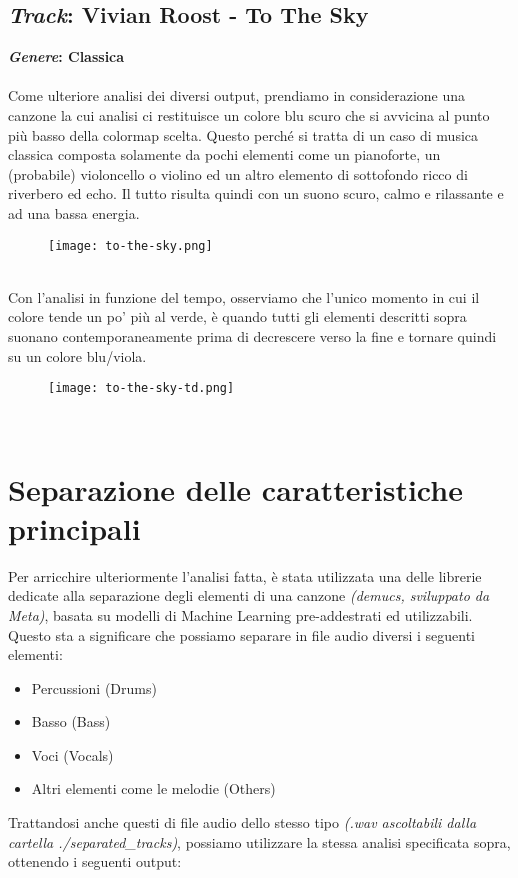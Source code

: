 \documentclass{article}
\begin{document}
\subsection{
    \textit{Track}: Vivian Roost - To The Sky
}
\textbf{\textit{Genere}: Classica}\\
\\
Come ulteriore analisi dei diversi output, prendiamo in considerazione una canzone la cui analisi ci restituisce un colore blu scuro che si avvicina al punto più basso della colormap scelta. Questo perché si tratta di un caso di musica classica composta solamente da pochi elementi come un pianoforte, un (probabile) violoncello o violino ed un altro elemento di sottofondo ricco di riverbero ed echo. Il tutto risulta quindi con un suono scuro, calmo e rilassante e ad una bassa energia.
\begin{figure}[h]
    \centering
    \texttt{[image: to-the-sky.png]}
    \label{fig:to-the-sky-full}
\end{figure}
\\
Con l'analisi in funzione del tempo, osserviamo che l'unico momento in cui il colore tende un po' più al verde, è quando tutti gli elementi descritti sopra suonano contemporaneamente prima di decrescere verso la fine e tornare quindi su un colore blu/viola.
\begin{figure}[h]
    \centering
    \texttt{[image: to-the-sky-td.png]}
    \label{fig:to-the-sky-td}
\end{figure}
\\
\newpage
\section{Separazione delle caratteristiche principali}
Per arricchire ulteriormente l'analisi fatta, è stata utilizzata una delle
librerie dedicate alla separazione degli elementi di una canzone
\textit{(demucs, sviluppato da Meta)}, basata su modelli di Machine Learning
pre-addestrati ed utilizzabili. Questo sta a significare che possiamo separare
in file audio diversi i seguenti elementi:
\begin{itemize}
    \item Percussioni (Drums)
    \item Basso (Bass)
    \item Voci (Vocals)
    \item Altri elementi come le melodie (Others)
\end{itemize}
Trattandosi anche questi di file audio dello stesso tipo \textit{(.wav ascoltabili dalla cartella ./separated\_tracks)}, possiamo utilizzare la stessa analisi specificata sopra, ottenendo i seguenti output:
\end{document}
